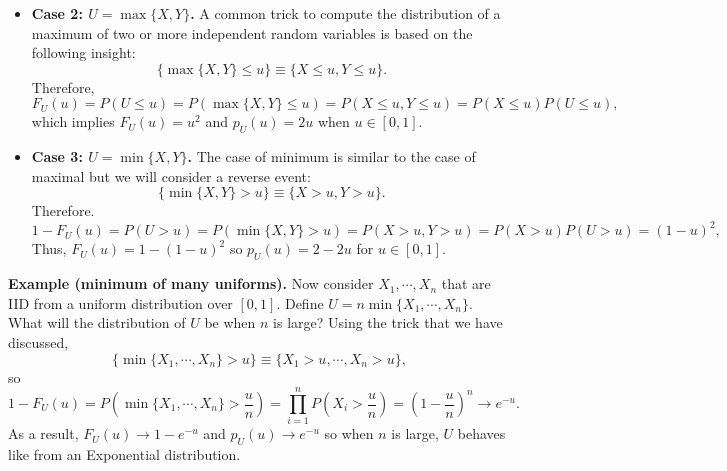 \documentclass[twoside]{article}
\newtheorem{proposition}[theorem]{Proposition}
\begin{document}
\begin{itemize}
\begin{proposition}
For discrete $X,Y$, we have the following expressions for the CDF and PMF of $Z$:
\[
F_Z(z)=\Pr(X+Y\le z)
= \sum_{k=-\infty}^{+\infty} F_X(z-k)\,p_Y(k)
= \sum_{k=-\infty}^{+\infty} F_Y(z-k)\,p_X(k),
\]
\[
p_Z(z)=\sum_{k=-\infty}^{+\infty} p_X(z-k)\,p_Y(k)
= \sum_{k=-\infty}^{+\infty} p_Y(z-k)\,p_X(k).
\]

Consider, using the above proposition to compute $p_U(u)$ directly for $u\in[0,2)$. We have that
\[
p_U(u)=\int_{-\infty}^{+\infty} p_X(u-t)\,p_Y(t)\,dt .
\]

\end{proposition}
\item {\bf Case 2: $U= \max\{X,Y\}$.}
A common trick to compute the distribution of a maximum of two or more independent random variables is based on the following insight:
$$
\{\max\{X,Y\}\leq u\} \equiv \{X\leq u,  Y\leq u\}.
$$
Therefore, 
$$
F_U(u) = P(U\leq u) = P(\max\{X,Y\}\leq u) = P(X\leq u, Y\leq u) = P(X\leq u)P(U\leq u),
$$
which implies $F_U(u) = u^2$ and $p_U(u) = 2u$
when $u\in[0,1]$.



\item {\bf Case 3: $U= \min\{X,Y\}$.}
The case of minimum is similar to the case of maximal but we will consider a reverse event:
$$
\{\min\{X,Y\}> u\} \equiv \{X> u,  Y> u\}.
$$
Therefore.
$$
1-F_U(u) = P(U> u) = P(\min\{X,Y\}> u) = P(X> u, Y> u) = P(X> u)P(U> u)  = (1-u)^2,
$$
Thus, $F_U(u) = 1-(1-u)^2$ so $p_U(u) = 2-2u$ for $u\in[0,1]$.

\end{itemize}




{\bf Example (minimum of many uniforms).}
Now consider $X_1,\cdots, X_n$ that are IID from a uniform distribution over $[0,1]$. 
Define $U = n \min\{X_1,\cdots, X_n\}$. 
What will the distribution of $U$ be when $n $ is large?
Using the trick that we have discussed, 
$$
\{\min\{X_1,\cdots,X_n\}> u\} \equiv \{X_1> u,\cdots,  X_n> u\},
$$
so 
$$
1-F_U(u) = P\left(\min\{X_1,\cdots,X_n\}> \frac{u}{n}\right) = \prod_{i=1}^n P\left(X_i>\frac{u}{n}\right) = \left(1-\frac{u}{n}\right)^n \rightarrow e^{-u}.
$$
As a result, $F_U(u) \rightarrow 1-e^{-u}$ and $p_U(u)\rightarrow e^{-u}$
so when $n$ is large, $U$ behaves like from an Exponential distribution. 
\end{document}
